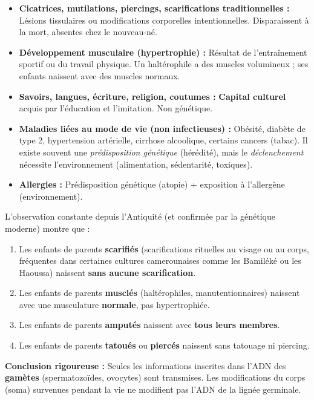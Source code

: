 \documentclass[11pt]{article}
\begin{document}
\begin{itemize}
    \item \textbf{Cicatrices, mutilations, piercings, scarifications traditionnelles :} Lésions tissulaires ou modifications corporelles intentionnelles. Disparaissent à la mort, absentes chez le nouveau-né.
    \item \textbf{Développement musculaire (hypertrophie) :} Résultat de l'entraînement sportif ou du travail physique. Un haltérophile a des muscles volumineux ; ses enfants naissent avec des muscles normaux.
    \item \textbf{Savoirs, langues, écriture, religion, coutumes :} \textbf{Capital culturel} acquis par l'éducation et l'imitation. Non génétique.
    \item \textbf{Maladies liées au mode de vie (non infectieuses) :} Obésité, diabète de type 2, hypertension artérielle, cirrhose alcoolique, certains cancers (tabac). Il existe souvent une \emph{prédisposition génétique} (hérédité), mais le \emph{déclenchement} nécessite l'environnement (alimentation, sédentarité, toxiques).
    \item \textbf{Allergies :} Prédisposition génétique (atopie) + exposition à l'allergène (environnement).
\end{itemize}

\begin{propriete}
L'observation constante depuis l'Antiquité (et confirmée par la génétique moderne) montre que :
\begin{enumerate}
    \item Les enfants de parents \textbf{scarifiés} (scarifications rituelles au visage ou au corps, fréquentes dans certaines cultures camerounaises comme les Bamiléké ou les Haoussa) naissent \textbf{sans aucune scarification}.
    \item Les enfants de parents \textbf{musclés} (haltérophiles, manutentionnaires) naissent avec une musculature \textbf{normale}, pas hypertrophiée.
    \item Les enfants de parents \textbf{amputés} naissent avec \textbf{tous leurs membres}.
    \item Les enfants de parents \textbf{tatoués} ou \textbf{piercés} naissent sans tatouage ni piercing.
\end{enumerate}
\par\textbf{Conclusion rigoureuse :} Seules les informations inscrites dans l'ADN des \textbf{gamètes} (spermatozoïdes, ovocytes) sont transmises. Les modifications du corps (soma) survenues pendant la vie ne modifient pas l'ADN de la lignée germinale.
\end{propriete}
\end{document}
